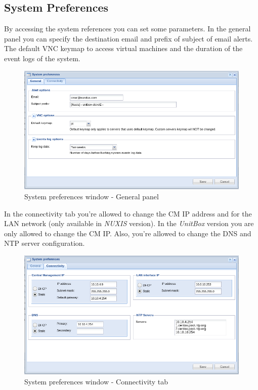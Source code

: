 \subsection{System Preferences}
By accessing the system references you can set some parameters. 
In the general panel you can specify the destination email and prefix of subject of email alerts. The default VNC keymap to access virtual machines and the duration of the event logs of the system.
 
\begin{figure}[H]
        \begin{center}
        \includegraphics[scale=0.5]{screenshots/preferences_general.png}
        \caption{System preferences window - General panel}
        \label{fig:preferences_general}
        \end{center}
\end{figure}

In the connectivity tab you're allowed to change the CM IP address and for the LAN network (only available in \emph{NUXIS} version). In the \emph{UnitBox} version you are only allowed to change the CM IP.
Also, you're allowed to change the DNS and NTP server configuration.

\begin{figure}[H]
        \begin{center}
        \includegraphics[scale=0.5]{screenshots/preferences_conn.png}
        \caption{System preferences window - Connectivity tab}
        \label{fig:preferences_conn}
        \end{center}
\end{figure}

